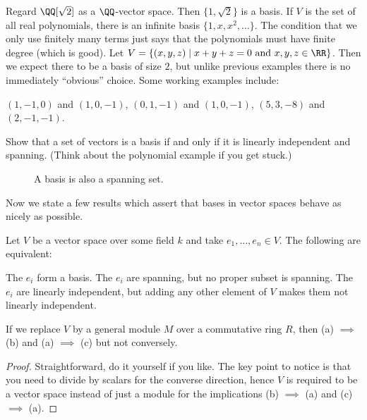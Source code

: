 \begin{example}
	\listhack
	\begin{enumerate}[(a)]
		\ii Regard $\QQ[\sqrt2]$ as a $\QQ$-vector space. Then $\{1, \sqrt 2\}$ is a basis.
		\ii If $V$ is the set of all real polynomials, there is an infinite basis $\{1, x, x^2, \dots\}$.
		The condition that we only use finitely many terms just says
		that the polynomials must have finite degree (which is good).
		\ii Let $V = \{ (x,y,z) \mid x+y+z=0 \text{ and } x,y,z \in \RR\}$.
		Then we expect there to be a basis of size $2$, but unlike previous examples
		there is no immediately ``obvious'' choice.
		Some working examples include:
		\begin{itemize}
			\ii $(1,-1,0)$ and $(1,0,-1)$,
			\ii $(0,1,-1)$ and $(1,0,-1)$,
			\ii $(5,3,-8)$ and $(2,-1,-1)$.
		\end{itemize}
	\end{enumerate}
\end{example}

\begin{ques}
	Show that a set of vectors is a basis if and only if
	it is linearly independent and spanning.
	(Think about the polynomial example if you get stuck.)
\end{ques}

\begin{figure}[ht]
	\centering
	\caption{A basis is also a spanning set.}
\end{figure}

Now we state a few results which assert
that bases in vector spaces behave as nicely as possible.
\begin{theorem}
	\label{thm:vector_best}
	Let $V$ be a vector space over some field $k$
	and take $e_1, \dots, e_n \in V$. The following are equivalent:
	\begin{enumerate}[(a)]
		\ii The $e_i$ form a basis.
		\ii The $e_i$ are spanning, but no proper subset is spanning.
		\ii The $e_i$ are linearly independent, but adding any other
		element of $V$ makes them not linearly independent.
	\end{enumerate}
\end{theorem}
\begin{remark}
	If we replace $V$ by a general module $M$ over a commutative ring $R$,
	then (a) $\implies$ (b) and (a) $\implies$ (c) but not conversely.
\end{remark}
\begin{proof}
	Straightforward, do it yourself if you like.
	The key point to notice is that you need to divide by scalars for the converse direction,
	hence $V$ is required to be a vector space instead of just a module
	for the implications (b) $\implies$ (a) and (c) $\implies$ (a).
\end{proof}


